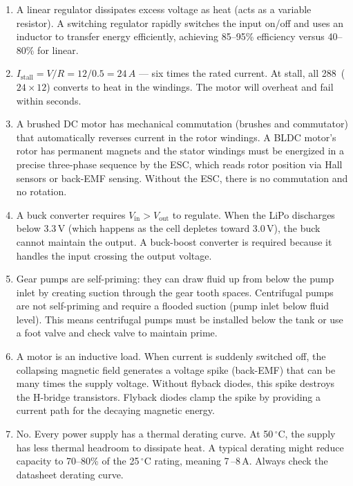 \documentclass[11pt,letterpaper,twoside,openany]{book}
\begin{document}
\begin{enumerate}[leftmargin=1.5em]
  \item A linear regulator dissipates excess voltage as heat (acts as a variable resistor). A switching regulator rapidly switches the input on/off and uses an inductor to transfer energy efficiently, achieving 85--95\% efficiency versus 40--80\% for linear.

  \item $I_{\text{stall}} = V/R = 12/0.5 = 24\,A$ --- six times the rated current. At stall, all 288\, ($24 \times 12$) converts to heat in the windings. The motor will overheat and fail within seconds.

  \item A brushed DC motor has mechanical commutation (brushes and commutator) that automatically reverses current in the rotor windings. A BLDC motor's rotor has permanent magnets and the stator windings must be energized in a precise three-phase sequence by the ESC, which reads rotor position via Hall sensors or back-EMF sensing. Without the ESC, there is no commutation and no rotation.

  \item A buck converter requires $V_{\text{in}} > V_{\text{out}}$ to regulate. When the LiPo discharges below 3.3\,V (which happens as the cell depletes toward 3.0\,V), the buck cannot maintain the output. A buck-boost converter is required because it handles the input crossing the output voltage.

  \item Gear pumps are self-priming: they can draw fluid up from below the pump inlet by creating suction through the gear tooth spaces. Centrifugal pumps are not self-priming and require a flooded suction (pump inlet below fluid level). This means centrifugal pumps must be installed below the tank or use a foot valve and check valve to maintain prime.

  \item A motor is an inductive load. When current is suddenly switched off, the collapsing magnetic field generates a voltage spike (back-EMF) that can be many times the supply voltage. Without flyback diodes, this spike destroys the H-bridge transistors. Flyback diodes clamp the spike by providing a current path for the decaying magnetic energy.

  \item No. Every power supply has a thermal derating curve. At 50\,$^{\circ}$C, the supply has less thermal headroom to dissipate heat. A typical derating might reduce capacity to 70--80\% of the 25\,$^{\circ}$C rating, meaning 7\,--8\,A. Always check the datasheet derating curve.


\end{enumerate}
\end{document}
